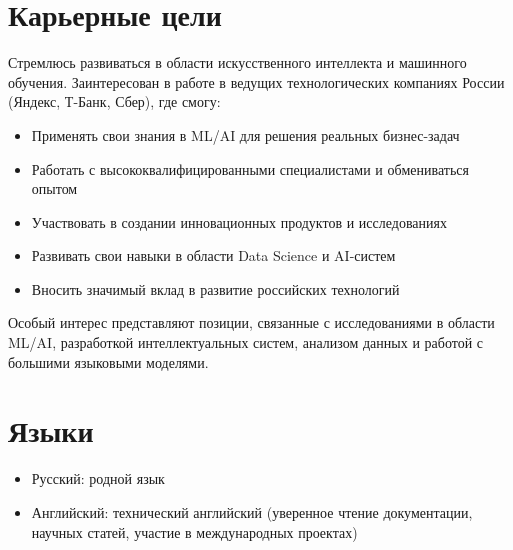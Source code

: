 \documentclass[11pt,a4paper]{article}
\newcommand{\hlblue}[1]{\textcolor{pastelblue}{#1}}
\newcommand{\hlgreen}[1]{\textcolor{pastelgreen}{#1}}
\newcommand{\hlpurple}[1]{\textcolor{pastelpurple}{#1}}
\newcommand{\hlteal}[1]{\textcolor{pastelteal}{#1}}
\newcommand{\hlorange}[1]{\textcolor{pastelorange}{#1}}
\newcommand{\hlrose}[1]{\textcolor{pastelrose}{#1}}
\begin{document}
\section{Карьерные цели}

Стремлюсь развиваться в области \hlblue{искусственного интеллекта} и \hlgreen{машинного обучения}. Заинтересован в работе в ведущих технологических компаниях России (\hlpurple{Яндекс}, \hlteal{Т-Банк}, \hlorange{Сбер}), где смогу:

\begin{itemize}
  \item Применять свои знания в ML/AI для решения реальных бизнес-задач
  \item Работать с высококвалифицированными специалистами и обмениваться опытом
  \item Участвовать в создании инновационных продуктов и исследованиях
  \item Развивать свои навыки в области Data Science и AI-систем
  \item Вносить значимый вклад в развитие российских технологий
\end{itemize}

Особый интерес представляют позиции, связанные с \hlrose{исследованиями в области ML/AI}, разработкой интеллектуальных систем, анализом данных и работой с большими языковыми моделями.

\section{Языки}

\begin{itemize}
  \item \hlblue{Русский:} родной язык
  \item \hlgreen{Английский:} технический английский (уверенное чтение документации, научных статей, участие в международных проектах)
\end{itemize}
\end{document}
